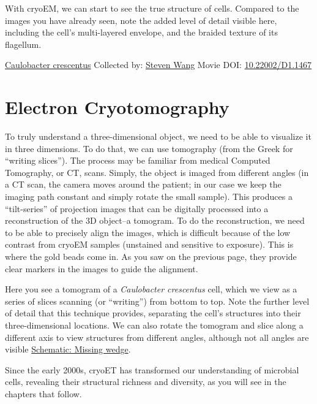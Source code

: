 \documentclass[]{tufte-book}
\begin{document}
With cryoEM, we can start to see the true structure of cells. Compared to the images you have already seen, note the added level of detail visible here, including the cell's multi-layered envelope, and the braided texture of its flagellum.



\hypertarget{htmlwidget-0e2e91a786305d5dddc9}{}

\label{fig:1-5}\protect\hyperlink{tree}{Caulobacter crescentus} Collected by: \protect\hyperlink{steven_wang}{Steven Wang} Movie DOI: \href{https://doi.org/10.22002/D1.1467}{10.22002/D1.1467}

\hypertarget{electron-cryotomography}{%
\section{Electron Cryotomography}\label{electron-cryotomography}}

To truly understand a three-dimensional object, we need to be able to visualize it in three dimensions. To do that, we can use tomography (from the Greek for ``writing slices''). The process may be familiar from medical Computed Tomography, or CT, scans. Simply, the object is imaged from different angles (in a CT scan, the camera moves around the patient; in our case we keep the imaging path constant and simply rotate the small sample). This produces a ``tilt-series'' of projection images that can be digitally processed into a reconstruction of the 3D object--a tomogram. To do the reconstruction, we need to be able to precisely align the images, which is difficult because of the low contrast from cryoEM samples (unstained and sensitive to exposure). This is where the gold beads come in. As you saw on the previous page, they provide clear markers in the images to guide the alignment.

Here you see a tomogram of a \emph{Caulobacter crescentus} cell, which we view as a series of slices scanning (or ``writing'') from bottom to top. Note the further level of detail that this technique provides, separating the cell's structures into their three-dimensional locations. We can also rotate the tomogram and slice along a different axis to view structures from different angles, although not all angles are visible \protect\hyperlink{Missing_wedge}{Schematic: Missing wedge}.

Since the early 2000s, cryoET has transformed our understanding of microbial cells, revealing their structural richness and diversity, as you will see in the chapters that follow.
\end{document}
